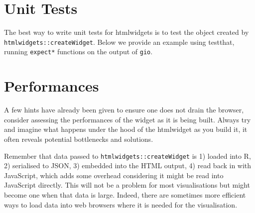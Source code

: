\documentclass[
]{krantz}
\makeatletter
\newenvironment{Shaded}{\begin{snugshade}}{\end{snugshade}}
\newcommand{\CommentTok}[1]{\textcolor[rgb]{0.37,0.37,0.37}{\textit{#1}}}
\newcommand{\KeywordTok}[1]{\textcolor[rgb]{0.27,0.27,0.27}{\textbf{#1}}}
\newcommand{\NormalTok}[1]{#1}
\newcommand{\OperatorTok}[1]{\textcolor[rgb]{0.43,0.43,0.43}{\textbf{#1}}}
\newcommand{\StringTok}[1]{\textcolor[rgb]{0.5,0.5,0.5}{#1}}
\newenvironment{kframe}{%
\medskip{}
\setlength{\fboxsep}{.8em}
 \def\at@end@of@kframe{}%
 \ifinner\ifhmode%
  \def\at@end@of@kframe{\end{minipage}}%
  \begin{minipage}{\columnwidth}%
 \fi\fi%
 \def\FrameCommand##1{\hskip\@totalleftmargin \hskip-\fboxsep
 \colorbox{shadecolor}{##1}\hskip-\fboxsep
     \hskip-\linewidth \hskip-\@totalleftmargin \hskip\columnwidth}%
 \MakeFramed {\advance\hsize-\width
   \@totalleftmargin\z@ \linewidth\hsize
   \@setminipage}}%
 {\par\unskip\endMakeFramed%
 \at@end@of@kframe}
\renewenvironment{Shaded}{\begin{kframe}}{\end{kframe}}
\makeatother
\begin{document}
\hypertarget{unit-tests}{%
\section{Unit Tests}\label{unit-tests}}

The best way to write unit tests for htmlwidgets is to test the object created by \texttt{htmlwidgets::createWidget}. Below we provide an example using testthat\citep{R-testthat}, running \texttt{expect*} functions on the output of \texttt{gio}.

\begin{Shaded}
\end{Shaded}

\hypertarget{performances}{%
\section{Performances}\label{performances}}

A few hints have already been given to ensure one does not drain the browser, consider assessing the performances of the widget as it is being built. Always try and imagine what happens under the hood of the htmlwidget as you build it, it often reveals potential bottlenecks and solutions.

Remember that data passed to \texttt{htmlwidgets::createWidget} is 1) loaded into R, 2) serialised to JSON, 3) embedded into the HTML output, 4) read back in with JavaScript, which adds some overhead considering it might be read into JavaScript directly. This will not be a problem for most visualisations but might become one when that data is large. Indeed, there are sometimes more efficient ways to load data into web browsers where it is needed for the visualisation.
\end{document}
